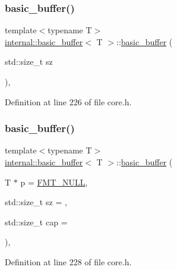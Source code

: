 \subsubsection{\texorpdfstring{basic\+\_\+buffer()}{basic\_buffer()}\hspace{0.1cm}{\footnotesize\ttfamily [1/2]}}
{\footnotesize\ttfamily template$<$typename T$>$ \\
\hyperlink{classinternal_1_1basic__buffer}{internal\+::basic\+\_\+buffer}$<$ T $>$\+::\hyperlink{classinternal_1_1basic__buffer}{basic\+\_\+buffer} (\begin{DoxyParamCaption}\item[{std\+::size\+\_\+t}]{sz }\end{DoxyParamCaption})\hspace{0.3cm}{\ttfamily [inline]}, {\ttfamily [protected]}}



Definition at line 226 of file core.\+h.

\mbox{\label{classinternal_1_1basic__buffer_ac3cc34ee5942d68ea7b02ea4c2c07176}} 
\subsubsection{\texorpdfstring{basic\+\_\+buffer()}{basic\_buffer()}\hspace{0.1cm}{\footnotesize\ttfamily [2/2]}}
{\footnotesize\ttfamily template$<$typename T$>$ \\
\hyperlink{classinternal_1_1basic__buffer}{internal\+::basic\+\_\+buffer}$<$ T $>$\+::\hyperlink{classinternal_1_1basic__buffer}{basic\+\_\+buffer} (\begin{DoxyParamCaption}\item[{T $\ast$}]{p = {\ttfamily \hyperlink{core_8h_af7f827e50dd7667484c279ac1d38f30b}{F\+M\+T\+\_\+\+N\+U\+LL}},  }\item[{std\+::size\+\_\+t}]{sz = {},  }\item[{std\+::size\+\_\+t}]{cap = {} }\end{DoxyParamCaption})\hspace{0.3cm}{\ttfamily [inline]}, {\ttfamily [protected]}}



Definition at line 228 of file core.\+h.

